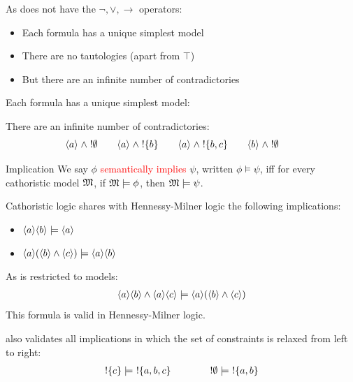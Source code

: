 \begin{frame}
As \cathoristic{} does not have the $\neg, \lor, \rightarrow$ operators:
\begin{itemize}
\item
Each formula has a unique simplest model
\item
There are no tautologies (apart from $\top$)
\item
But there are an infinite number of contradictories
\end{itemize}
\end{frame}

\begin{frame}
Each formula has a unique simplest model:

\end{frame}

\begin{frame}
There are an infinite number of contradictories:
\[
   \langle a \rangle \;\land\; ! \emptyset \qquad
   \langle a \rangle \;\land\; ! \{b\} \qquad
   \langle a \rangle \;\land\; ! \{b, c\} \qquad
   \langle b \rangle \;\land\; ! \emptyset \qquad
\]
\end{frame}


\begin{frame}{Implication}
We say $\phi$ \textcolor{red}{semantically implies} $\psi$, written $\phi \models \psi$, iff for every cathoristic model $\frak{M}$, if  $\frak{M} \models \phi$, then $\frak{M} \models \psi$.
\end{frame}

\begin{frame}
Cathoristic logic shares with Hennessy-Milner logic the following implications:
\begin{itemize}
\item
$\MAY{a} \MAY{b} \models \MAY{a}$
\item
$\MAY{a} (\MAY{b} \land \MAY{c}) \models \MAY{a} \MAY{b}$
\end{itemize}
\end{frame}

\begin{frame}
As \cathoristic{} is restricted to  models:
\begin{eqnarray*}
\langle a \rangle \langle b \rangle \land \langle a \rangle \langle c \rangle \models \langle a \rangle (\langle b \rangle \land \langle c \rangle )
\end{eqnarray*}
This formula is  valid in Hennessy-Milner logic.
\end{frame}

\begin{frame}
\Cathoristic{} also validates all implications in which the set of constraints is relaxed from left to right:
\begin{eqnarray*}
! \{c\} \models\ ! \{a, b, c\} 
 \qquad\qquad
! \emptyset \models\ ! \{a, b\} 
\end{eqnarray*}
\end{frame}

